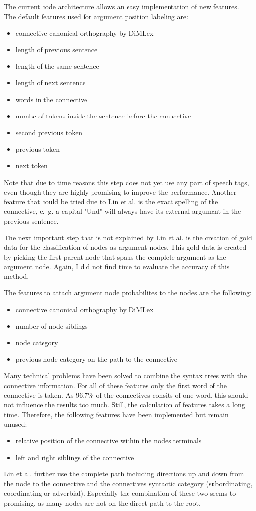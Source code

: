 \documentclass[10pt,a4paper]{article}
\begin{document}
The current code architecture allows an easy implementation of new features. The default features used for argument position labeling are:
\begin{itemize}
\item connective canonical orthography by DiMLex
\item length of previous sentence
\item length of the same sentence
\item length of next sentence
\item words in the connective
\item numbe of tokens inside the sentence before the connective
\item second previous token
\item previous token
\item next token
\end{itemize}
Note that due to time reasons this step does not yet use any part of speech tags, even though they are highly promising to improve the performance. Another feature that could be tried due to Lin et al. is the exact spelling of the connective, e.~g. a capital "Und" will always have its external argument in the previous sentence.

The next important step that is not explained by Lin et al. is the creation of gold data for the classification of nodes as argument nodes. This gold data is created by picking the first parent node that spans the complete argument as the argument node. Again, I did not find time to evaluate the accuracy of this method.

The features to attach argument node probabilites to the nodes are the following:
\begin{itemize}
\item connective canonical orthography by DiMLex
\item number of node siblings
\item node category
\item previous node category on the path to the connective
\end{itemize}
Many technical problems have been solved to combine the syntax trees with the connective information. For all of these features only the first word of the connective is taken. As 96.7\% of the connectives consits of one word, this should not influence the results too much. Still, the calculation of features takes a long time. Therefore, the following features have been implemented but remain unused:
\begin{itemize}
\item relative position of the connective within the nodes terminals
\item left and right siblings of the connective
\end{itemize}
Lin et al. further use the complete path including directions up and down from the node to the connective and the connectives syntactic category (subordinating, coordinating or adverbial). Especially the combination of these two seems to promising, as many nodes are not on the direct path to the root. 
\end{document}
